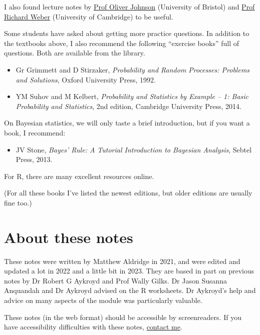 \documentclass[
  a4paper,
]{book}
\providecommand{\tightlist}{%
  \setlength{\itemsep}{0pt}\setlength{\parskip}{0pt}}
\theoremstyle{definition}
\theoremstyle{definition}
\theoremstyle{definition}
\theoremstyle{definition}
\theoremstyle{remark}
\begin{document}
I also found lecture notes by \href{https://people.maths.bris.ac.uk/~maotj/teaching.html}{Prof Oliver Johnson} (University of Bristol) and \href{http://www.statslab.cam.ac.uk/~rrw1/prob/index.html}{Prof Richard Weber} (University of Cambridge) to be useful.

Some students have asked about getting more practice questions. In addition to the textbooks above, I also recommend the following ``exercise books'' full of questions. Both are available from the library.

\begin{itemize}
\tightlist
\item
  Gr Grimmett and D Stirzaker, \emph{Probability and Random Processes: Problems and Solutions}, Oxford University Press, 1992.
\item
  YM Suhov and M Kelbert, \emph{Probability and Statistics by Example -- 1: Basic Probability and Statistics}, 2nd edition, Cambridge University Press, 2014.
\end{itemize}

On Bayesian statistics, we will only taste a brief introduction, but if you want a book, I recommend:

\begin{itemize}
\tightlist
\item
  JV Stone, \emph{Bayes' Rule: A Tutorial Introduction to Bayesian Analysis}, Sebtel Press, 2013.
\end{itemize}

For R, there are many excellent resources online.

(For all these books I've listed the newest editions, but older editions are usually fine too.)

\hypertarget{about-notes}{%
\section*{About these notes}\label{about-notes}}

These notes were written by Matthew Aldridge in 2021, and were edited and updated a lot in 2022 and a little bit in 2023. They are based in part on previous notes by Dr Robert G Aykroyd and Prof Wally Gilks. Dr Jason Susanna Anquandah and Dr Aykroyd advised on the R worksheets. Dr Aykroyd's help and advice on many aspects of the module was particularly valuable.

These notes (in the web format) should be accessible by screenreaders. If you have accessibility difficulties with these notes, \href{mailto:m.aldridge@leeds.ac.uk}{contact me}.
\end{document}
